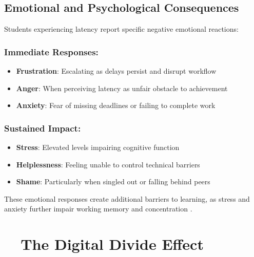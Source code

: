 \subsection{Emotional and Psychological Consequences}\label{emotional-and-psychological-consequences}

Students experiencing  latency report specific negative emotional reactions:

\subsubsection{Immediate Responses:}

\begin{itemize}
	\item \textbf{Frustration}: Escalating as delays persist and disrupt workflow \supercite{Lazarus1991EmotionAndAdaptation}
	\item \textbf{Anger}: When perceiving latency as unfair obstacle to achievement \supercite{Fogg2003PersuasiveTechnology}
	\item \textbf{Anxiety}: Fear of missing deadlines or failing to complete work \supercite{Zeidner1998TestAnxiety}
\end{itemize}


\subsubsection{Sustained Impact:}

\begin{itemize}
	\item \textbf{Stress}: Elevated levels impairing cognitive function \supercite{Sapolsky2004WhyZebrasDontGetUlcers}
	\item \textbf{Helplessness}: Feeling unable to control technical barriers \supercite{Seligman1975Helplessness}
	\item \textbf{Shame}: Particularly when singled out or falling behind peers \supercite{Brown2010TheGiftsOfImperfection}
\end{itemize}


These emotional responses create additional barriers to learning, as stress and anxiety further impair working memory and concentration \supercite{Eysenck2007AnxietyAndCognition}.

\section{~~The Digital Divide Effect}\label{the-digital-divide-effect}


